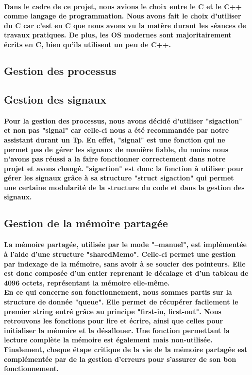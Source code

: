\documentclass[utf8]{article}
\begin{document}
\paragraph{Dans le cadre de ce projet, nous avions le choix entre le C et le C++ comme langage de programmation.
Nous avons fait le choix d'utiliser du C car c'est en C que nous avons vu la matère durant les séances de travaux pratiques. 
De plus, les OS modernes sont majoritairement écrits en C, bien qu'ils utilisent un peu de C++.}


\subsection{Gestion des processus}
\paragraph{}

\subsection{Gestion des signaux}
\paragraph{Pour la gestion des processus, nous avons décidé d'utiliser "sigaction" et non pas "signal" car celle-ci nous a été recommandée par notre assistant durant un Tp.
En effet, "signal" est une fonction qui ne permet pas de gérer les signaux de manière fiable, du moins nous n'avons pas réussi a la faire fonctionner 
correctement dans notre projet et avons changé. "sigaction" est donc la fonction à utiliser pour gérer les signaux grâce à sa structure 
"struct sigaction" qui permet une certaine modularité de la structure du code et dans la gestion des signaux.}

\subsection{Gestion de la mémoire partagée}
\paragraph{La mémoire partagée, utilisée par le mode "--manuel", est implémentée à l'aide d'une structure "sharedMemo". Celle-ci permet une gestion
par indexage de la mémoire, sans avoir à se soucier des pointeurs. Elle est donc composée d'un entier reprenant le décalage et d'un tableau de 4096 octets,
représentant la mémoire elle-même. \\En ce qui concerne son fonctionnement, nous sommes partis sur la structure de donnée "queue". Elle
permet de récupérer facilement le premier string entré grâce au principe "first-in, first-out". Nous retrouvons les fonctions pour lire et écrire, ainsi
que celles pour initialiser la mémoire et la désallouer. Une fonction permettant la lecture complète la mémoire est également mais non-utilisée.
Finalement, chaque étape critique de la vie de la mémoire partagée est complémentée par de la gestion d'erreurs pour s'assurer de son bon fonctionnement.}
\end{document}
